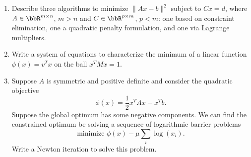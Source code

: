 \documentclass[12pt, leqno]{article}
\begin{document}
\begin{enumerate}
\item
  Describe three algorithms to minimize $\|Ax-b\|^2$ subject to
  $Cx = d$, where $A \in \bbR^{m \times n}$, $m > n$ and
  $C \in \bbR^{p \times m}$, $p < m$: one based on constraint
  elimination, one a
  quadratic penalty formulation, and one via Lagrange multipliers.
\item
  Write a system of equations to characterize the minimum of
  a linear function $\phi(x) = v^T x$ on the ball $x^T M x = 1$.
\item
  Suppose $A$ is symmetric and positive definite and consider
  the quadratic objective
  \[
    \phi(x) = \frac{1}{2} x^T A x - x^T b.
  \]
  Suppose the global optimum has some negative components.
  We can find the constrained optimum be solving a sequence of
  logarithmic barrier problems
  \[
    \mbox{minimize } \phi(x) - \mu \sum_i \log(x_i).
  \]
  Write a Newton iteration to solve this problem.
\end{enumerate}
\end{document}
